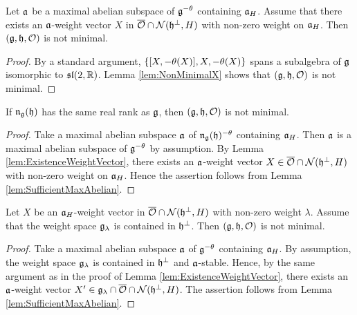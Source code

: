 \begin{lemma} \label{lem:SufficientMaxAbelian}
	Let $\mathfrak{a}$ be a maximal abelian subspace of $\mathfrak{g}^{-\theta}$ containing $\mathfrak{a}_H$.
	Assume that there exists an $\mathfrak{a}$-weight vector $X$ in $\overline{\mathcal{O}} \cap \mathcal{N}(\mathfrak{h}^\perp, H)$ with non-zero weight on $\mathfrak{a}_H$.
	Then $(\mathfrak{g}, \mathfrak{h}, \mathcal{O})$ is not minimal.
\end{lemma}

\begin{proof}
	By a standard argument, $\left\{[X, -\theta(X)], X, -\theta(X) \right\}$ spans a subalgebra of $\mathfrak{g}$ isomorphic to $\mathfrak{sl}(2,\mathbb{R})$.
	Lemma \ref{lem:NonMinimalX} shows that $(\mathfrak{g}, \mathfrak{h}, \mathcal{O})$ is not minimal.
\end{proof}

\begin{corollary} \label{cor:SufficientSameRank}
	If $\mathfrak{n}_{\mathfrak{g}}(\mathfrak{h})$ has the same real rank as $\mathfrak{g}$, then $(\mathfrak{g}, \mathfrak{h}, \mathcal{O})$ is not minimal.
\end{corollary}

\begin{proof}
	Take a maximal abelian subspace $\mathfrak{a}$ of $\mathfrak{n}_{\mathfrak{g}}(\mathfrak{h})^{-\theta}$ containing $\mathfrak{a}_H$.
	Then $\mathfrak{a}$ is a maximal abelian subspace of $\mathfrak{g}^{-\theta}$ by assumption.
	By Lemma \ref{lem:ExistenceWeightVector}, there exists an $\mathfrak{a}$-weight vector $X \in \overline{\mathcal{O}} \cap \mathcal{N}(\mathfrak{h}^\perp, H)$ with non-zero weight on $\mathfrak{a}_H$.
	Hence the assertion follows from Lemma \ref{lem:SufficientMaxAbelian}.
\end{proof}

\begin{corollary} \label{cor:SufficientNonRoot}
	Let $X$ be an $\mathfrak{a}_H$-weight vector in $\overline{\mathcal{O}} \cap \mathcal{N}(\mathfrak{h}^\perp, H)$ with non-zero weight $\lambda$.
	Assume that the weight space $\mathfrak{g}_\lambda$ is contained in $\mathfrak{h}^\perp$.
	Then $(\mathfrak{g}, \mathfrak{h}, \mathcal{O})$ is not minimal.
\end{corollary}

\begin{proof}
	Take a maximal abelian subspace $\mathfrak{a}$ of $\mathfrak{g}^{-\theta}$ containing $\mathfrak{a}_H$.
	By assumption, the weight space $\mathfrak{g}_\lambda$ is contained in $\mathfrak{h}^\perp$ and $\mathfrak{a}$-stable.
	Hence, by the same argument as in the proof of Lemma \ref{lem:ExistenceWeightVector}, there exists an $\mathfrak{a}$-weight vector $X' \in \mathfrak{g}_\lambda \cap \overline{\mathcal{O}} \cap \mathcal{N}(\mathfrak{h}^\perp, H)$.
	The assertion follows from Lemma \ref{lem:SufficientMaxAbelian}.
\end{proof}

